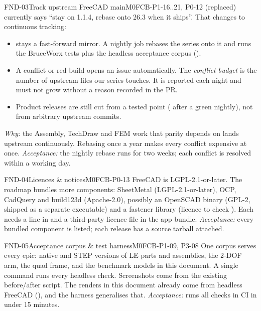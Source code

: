 \begin{epic}{FND-03}{Track upstream FreeCAD main}{M0}{\stTodo}{FCB-P1-16..21, P0-12 (replaced)}
 currently says ``stay on 1.1.4, rebase onto 26.3 when it ships''. That changes to
continuous tracking:
\begin{itemize}
  \item {} stays a fast-forward mirror. A nightly job rebases the \code{[BW]} series onto it
        and runs the BruceWorx tests plus the headless acceptance corpus ().
  \item A conflict or red build opens an issue automatically. The \emph{conflict budget} is the number of
        upstream files our series touches. It is reported each night and must not grow without a reason
        recorded in the PR.
  \item Product releases are still cut from a tested point ( after a green nightly), not from
        arbitrary upstream commits.
\end{itemize}
\emph{Why:} the Assembly, TechDraw and FEM work that parity depends on lands upstream continuously.
Rebasing once a year makes every conflict expensive at once.
\emph{Acceptance:} the nightly rebase runs for two weeks; each conflict is resolved within a working day.
\end{epic}

\begin{epic}{FND-04}{Licences \& notices}{M0}{\stTodo}{FCB-P0-13}
FreeCAD is LGPL-2.1-or-later. The roadmap bundles more components: SheetMetal (LGPL-2.1-or-later), OCP, CadQuery and build123d
(Apache-2.0), possibly an OpenSCAD binary (GPL-2, shipped as a separate executable) and a fastener library
(licence to check \verify). Each needs a line in  and a third-party licence file in the app
bundle.
\emph{Acceptance:} every bundled component is listed; each release has a source tarball attached.
\end{epic}

\begin{epic}{FND-05}{Acceptance corpus \& test harness}{M0}{\stTodo}{FCB-P1-09, P3-08}
One corpus serves every epic: native and STEP versions of LE parts and assemblies, the 2-DOF arm, the quad
frame, and the benchmark models in this document. A single command runs every headless check.
Screenshots come from the existing before/after script. The renders in this document already come from
headless FreeCAD (), and the harness generalises that.
\emph{Acceptance:}  runs all checks in CI in under 15 minutes.
\end{epic}

